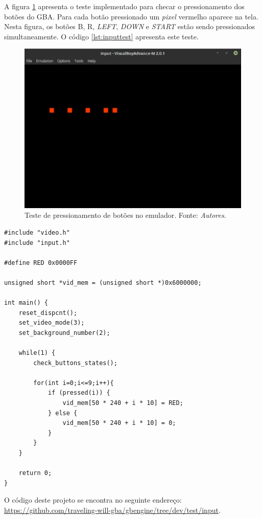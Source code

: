 A figura \ref{demo-input} apresenta o teste implementado para checar o pressionamento dos botões do GBA. Para cada botão pressionado um \textit{pixel} vermelho aparece na tela. Nesta figura, os botões B, R, \textit{LEFT}, \textit{DOWN} e \textit{START} estão sendo pressionados simultaneamente. O código \ref{lst:inputtest} apresenta este teste.

\begin{figure}[H]
 \centering \includegraphics[keepaspectratio=true,scale=0.6]{figuras/demo-input.eps}
   \caption[Demonstração do pressionamento de botões no emulador]
    {Teste de pressionamento de botões no emulador. Fonte: \textit{Autores}.}
   \label{demo-input}
\end{figure}

\begin{lstlisting}[float,caption={Código de teste de \textit{input}.},label={lst:inputtest}]
#include "video.h"
#include "input.h"

#define RED 0x0000FF

unsigned short *vid_mem = (unsigned short *)0x6000000;

int main() {
    reset_dispcnt();
    set_video_mode(3);
    set_background_number(2);

    while(1) {
        check_buttons_states();

        for(int i=0;i<=9;i++){
            if (pressed(i)) {
                vid_mem[50 * 240 + i * 10] = RED;
            } else {
                vid_mem[50 * 240 + i * 10] = 0;
            }
        }
    }

    return 0;
}
\end{lstlisting}

O código deste projeto se encontra no seguinte endereço: \url{https://github.com/traveling-will-gba/gbengine/tree/dev/test/input}.